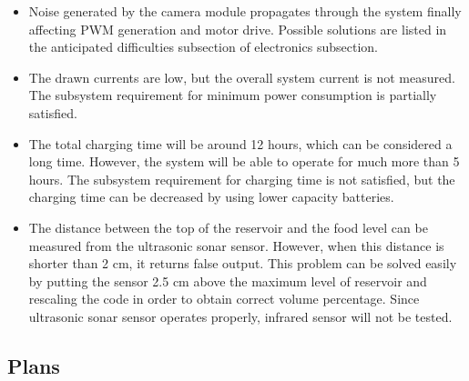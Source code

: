 \begin{itemize}
\item Noise generated by the camera module propagates through the system finally affecting PWM generation and motor drive. Possible solutions are listed in the anticipated difficulties subsection of electronics subsection.
 
\item The drawn currents are low, but the overall system current is not measured. The subsystem requirement for minimum power consumption is partially satisfied.
\item The total charging time will be around 12 hours, which can be considered a long time. However, the system will be able to operate for much more than 5 hours. The subsystem requirement for charging time is not satisfied, but the charging time can be decreased by using lower capacity batteries.

\item The distance between the top of the reservoir and the food level can be measured from the ultrasonic sonar sensor. However, when this distance is shorter than 2 cm, it returns false output. This problem can be solved easily by putting the sensor 2.5 cm above the maximum level of reservoir and rescaling the code in order to obtain correct volume percentage. Since ultrasonic sonar sensor operates properly, infrared sensor will not be tested.



\end{itemize}






\subsection{Plans}


